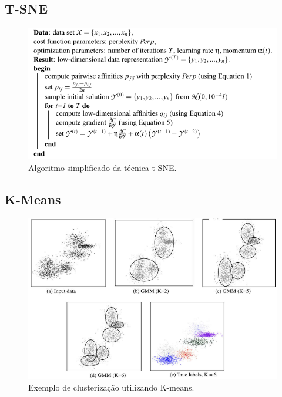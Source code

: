 % 

\subsection{T-SNE}

\begin{figure}[H]
    \caption{Algoritmo simplificado da técnica t-SNE.}
    \begin{center}
        \includegraphics[scale=.45]{referencial/img/t-sne_algorithm_maaten_p9.png}
    \end{center}
    \label{fig:t-sne_algorithm_maaten_p9}
\end{figure}

% 

\subsection{K-Means}

\begin{figure}[H]
    \caption{Exemplo de clusterização utilizando K-means.}
    \begin{center}
        \includegraphics[scale=.5]{referencial/img/k-means_jain_p7.png}
    \end{center}
    \label{fig:k-means_jain_p7}
\end{figure}



